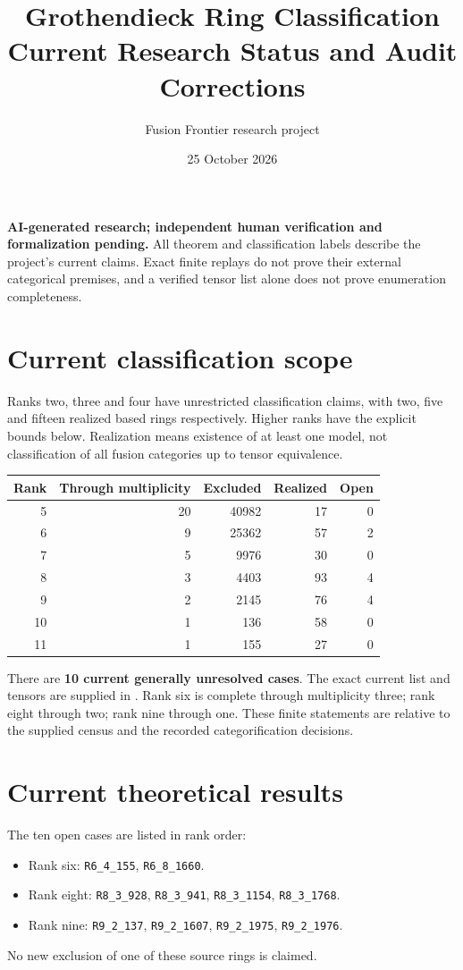 \documentclass[11pt,a4paper]{article}
\title{Grothendieck Ring Classification\\Current Research Status and Audit Corrections}
\author{Fusion Frontier research project}\date{25 October 2026}
\begin{document}
\maketitle
\textbf{AI-generated research; independent human verification and formalization pending.}
All theorem and classification labels describe the project's current claims.
Exact finite replays do not prove their external categorical premises, and a
verified tensor list alone does not prove enumeration completeness.

\section{Current classification scope}
Ranks two, three and four have unrestricted classification claims, with two,
five and fifteen realized based rings respectively. Higher ranks have the
explicit bounds below. Realization means existence of at least one model,
not classification of all fusion categories up to tensor equivalence.

\begin{center}\begin{tabular}{rrrrr}\toprule
Rank & Through multiplicity & Excluded & Realized & Open\\\midrule
5&20&40982&17&0\\
6&9&25362&57&2\\
7&5&9976&30&0\\
8&3&4403&93&4\\
9&2&2145&76&4\\
10&1&136&58&0\\
11&1&155&27&0\\\bottomrule
\end{tabular}\end{center}
There are \textbf{10 current generally unresolved cases}. The exact current
list and tensors are supplied in .
Rank six is complete through multiplicity three; rank eight through two;
rank nine through one. These finite statements are relative to the supplied
census and the recorded categorification decisions.

\section{Current theoretical results}
The ten open cases are listed in rank order:
\begin{itemize}
\item Rank six: \texttt{R6\_4\_155}, \texttt{R6\_8\_1660}.
\item Rank eight: \texttt{R8\_3\_928}, \texttt{R8\_3\_941},
      \texttt{R8\_3\_1154}, \texttt{R8\_3\_1768}.
\item Rank nine: \texttt{R9\_2\_137}, \texttt{R9\_2\_1607},
      \texttt{R9\_2\_1975}, \texttt{R9\_2\_1976}.
\end{itemize}
No new exclusion of one of these source rings is claimed.
\end{document}
